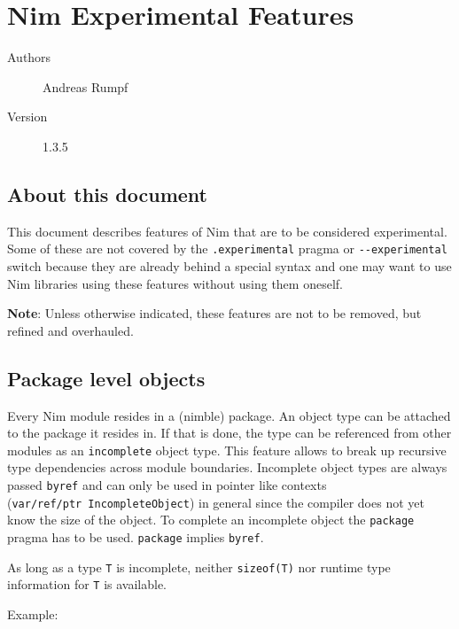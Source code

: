 \hypertarget{nim-experimental-features}{%
\section{Nim Experimental Features}\label{nim-experimental-features}}

\begin{description}
\item[Authors]
Andreas Rumpf
\item[Version]
1.3.5
\end{description}

\hypertarget{about-this-document}{%
\subsection{About this document}\label{about-this-document}}

This document describes features of Nim that are to be considered
experimental. Some of these are not covered by the
\texttt{.experimental} pragma or \texttt{-\/-experimental} switch
because they are already behind a special syntax and one may want to use
Nim libraries using these features without using them oneself.

\textbf{Note}: Unless otherwise indicated, these features are not to be
removed, but refined and overhauled.

\hypertarget{package-level-objects}{%
\subsection{Package level objects}\label{package-level-objects}}

Every Nim module resides in a (nimble) package. An object type can be
attached to the package it resides in. If that is done, the type can be
referenced from other modules as an \texttt{incomplete} object type.
This feature allows to break up recursive type dependencies across
module boundaries. Incomplete object types are always passed
\texttt{byref} and can only be used in pointer like contexts
(\texttt{var/ref/ptr\ IncompleteObject}) in general since the compiler
does not yet know the size of the object. To complete an incomplete
object the \texttt{package} pragma has to be used. \texttt{package}
implies \texttt{byref}.

As long as a type \texttt{T} is incomplete, neither \texttt{sizeof(T)}
nor runtime type information for \texttt{T} is available.

Example:

